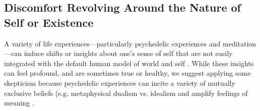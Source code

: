 \documentclass[12pt,letterpaper]{book}
\begin{document}
\subsection*{Discomfort Revolving Around the Nature of Self or Existence}
A variety of life experiences—particularly psychedelic experiences and meditation—can induce shifts or insights about one's sense of self that are not easily integrated with the default human model of world and self \cite{evans2020}. While these insights can feel profound, and are sometimes true or healthy, we suggest applying some skepticism because psychedelic experiences can incite a variety of mutually exclusive beliefs (e.g. metaphysical dualism vs. idealism  \cite{timmermann2021metaphysics} and amplify feelings of meaning \cite{hartogsohn2018meaning}.
\end{document}
